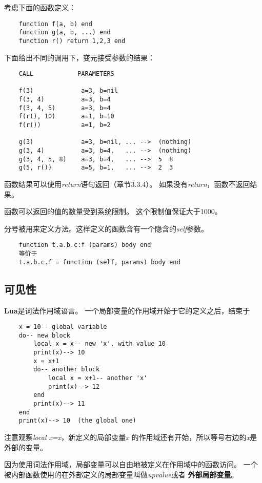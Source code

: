 \documentclass{ctexart}
\begin{document}
考虑下面的函数定义：

\lstset{language=C}
\begin{lstlisting}
	function f(a, b) end
	function g(a, b, ...) end
	function r() return 1,2,3 end
\end{lstlisting}

下面给出不同的调用下，变元接受参数的结果：

\lstset{language=C}
\begin{lstlisting}
	CALL            PARAMETERS
	     
	f(3)             a=3, b=nil
	f(3, 4)          a=3, b=4
	f(3, 4, 5)       a=3, b=4
	f(r(), 10)       a=1, b=10
	f(r())           a=1, b=2
	     
	g(3)             a=3, b=nil, ... -->  (nothing)
	g(3, 4)          a=3, b=4,   ... -->  (nothing)
	g(3, 4, 5, 8)    a=3, b=4,   ... -->  5  8
	g(5, r())        a=5, b=1,   ... -->  2  3
\end{lstlisting}

函数结果可以使用\emph{return}语句返回（章节3.3.4）。
如果没有\emph{return}，函数不返回结果。

函数可以返回的值的数量受到系统限制。
这个限制值保证大于1000。

分号被用来定义方法。这样定义的函数含有一个隐含的\emph{self}参数。

\lstset{language=C}
\begin{lstlisting}
	function t.a.b.c:f (params) body end
	等价于
	t.a.b.c.f = function (self, params) body end
\end{lstlisting}

\subsection{可见性}

\textbf{Lua}是词法作用域语言。
一个局部变量的作用域开始于它的定义之后，结束于

\lstset{language=C}
\begin{lstlisting}
	x = 10-- global variable
	do-- new block
		local x = x-- new 'x', with value 10
		print(x)--> 10
		x = x+1
		do-- another block
			local x = x+1-- another 'x'
			print(x)--> 12
		end
		print(x)--> 11
	end
	print(x)--> 10  (the global one)
\end{lstlisting}

注意观察\emph{local x=x}，新定义的局部变量\emph{x}
的作用域还有开始，所以等号右边的\emph{x}是外部的变量。

因为使用词法作用域，局部变量可以自由地被定义在作用域中的函数访问。
一个被内部函数使用的在外部定义的局部变量叫做\emph{upvalue}或者
\textbf{外部局部变量}。
\end{document}
